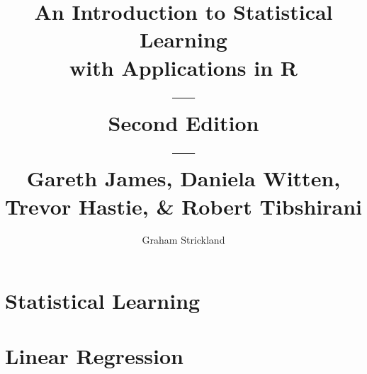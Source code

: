 \documentclass{article}
\title{
    An Introduction to Statistical Learning\\with Applications in R\\---\\
    Second Edition\\---\\Gareth James, Daniela Witten, Trevor Hastie, \& Robert Tibshirani
}
\author{Graham Strickland}
\begin{document}
\maketitle  

\setcounter{section}{1}
\section{Statistical Learning}


\section{Linear Regression}

\end{document}
